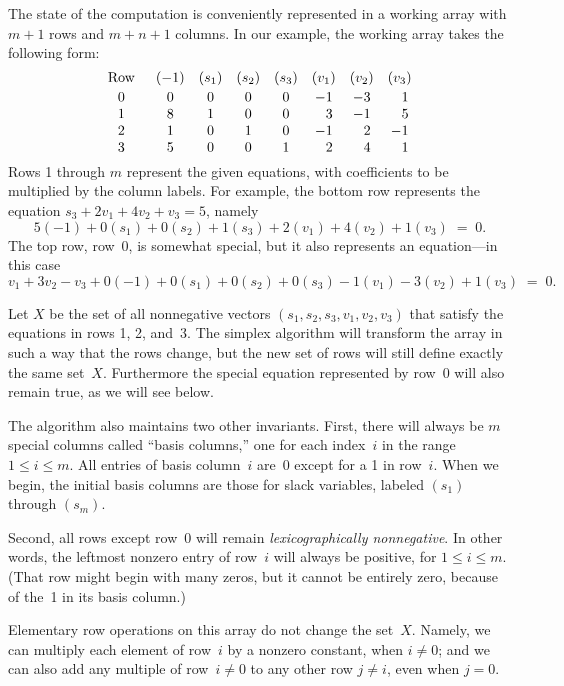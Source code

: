 The state of the computation is conveniently represented in a
working array with $m+1$ rows and $m+n+1$ columns. In our example,
the working array takes the following form:
$$\def\\{\phantom-}
\vcenter{\halign{\hfil$#$\hfil\enspace&&\quad\hfil$#$\hfil\cr
\rm Row&(-1)&(s_1)&(s_2)&(s_3)&(v_1)&(v_2)&(v_3)\cr
\noalign{\vskip2pt}
0& 0& 0& 0& 0&-1&-3&\\1\cr
1& 8& 1& 0& 0&\\3&-1&\\5\cr
2& 1& 0& 1& 0&-1&\\2&-1\cr
3& 5& 0& 0& 1&\\2&\\4&\\1\cr}}$$
Rows 1 through $m$ represent the given equations, with coefficients
to be multiplied by the column labels. For example, the bottom row
represents the equation $s_3+2v_1+4v_2+v_3=5$, namely
$$5(-1)+0(s_1)+0(s_2)+1(s_3)+2(v_1)+4(v_2)+1(v_3)\;=\;0.$$
The top row, row~0, is somewhat special, but it also represents an
equation---in this case
$$v_1+3v_2-v_3+0(-1)+0(s_1)+0(s_2)+0(s_3)-1(v_1)-3(v_2)+1(v_3)\;=\;0.$$

Let $X$ be the set of all nonnegative vectors $(s_1,s_2,s_3,v_1,v_2,v_3)$
that satisfy the equations in rows 1, 2, and~3. The simplex algorithm
will transform the array in such a way that the rows change, but the
new set of rows will still define exactly the same set~$X$. Furthermore
the special equation represented by row~0 will also remain true, as
we will see below.

\fi

The algorithm also maintains two other invariants. First, there
will always
be $m$ special columns called ``basis columns,'' one for each index~$i$
in the range $1\le i\le m$. All entries of basis column~$i$ are~0
except for a 1 in row~$i$. When we begin, the initial basis columns are those
for slack variables, labeled $(s_1)$ through $(s_m)$.

Second, all rows except row~0 will remain {\it lexicographically
nonnegative}. In other words, the leftmost nonzero entry of row~$i$
will always be positive, for $1\le i\le m$. (That row might begin with
many zeros, but it cannot be
entirely zero, because of the~1 in its basis column.)

\fi

Elementary row operations on this array do not change the
set~$X$.
Namely, we can multiply each element of row~$i$ by a nonzero constant,
when $i\ne0$; and we can also add any multiple of row~$i\ne0$ to any
other row $j\ne i$, even when $j=0$.

